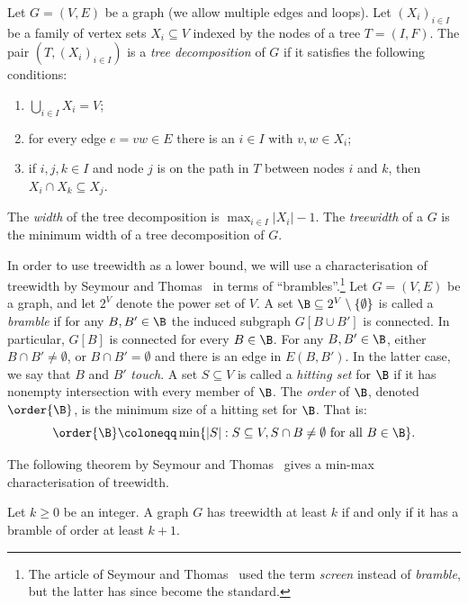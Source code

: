 Let $G=(V,E)$ be a graph (we allow multiple edges and loops). Let $(X_i)_{i\in I}$ be a family of vertex sets $X_i\subseteq V$ indexed by the nodes of a tree $T=(I,F)$. The pair $(T,(X_i)_{i\in I})$ is a \emph{tree decomposition} of $G$ if it satisfies the following conditions: 
\begin{enumerate}[label=(\roman*)]
 \item $\bigcup_{i\in I} X_i = V$;
 \item for every edge $e=vw\in E$ there is an $i\in I$ with $v,w\in X_i$;
 \item if $i,j,k\in I$ and node $j$ is on the path in $T$ between nodes $i$ and $k$, then $X_i\cap X_k\subseteq X_j$.
\end{enumerate}
The \emph{width} of the tree decomposition is $\max_{i\in I} |X_i|-1$. The \emph{treewidth} of a $G$ is the minimum width of a tree decomposition of $G$. 


In order to use treewidth as a lower bound, we will use a characterisation of treewidth by Seymour and Thomas~\cite{SeymourThomas1993} in terms of ``brambles''.\footnote{The article of Seymour and Thomas~\cite{SeymourThomas1993} used the term \emph{screen} instead of \emph{bramble}, but the latter has since become the standard.} Let $G=(V,E)$ be a graph, and let $2^V$ denote the power set of $V$. A set $\B\subseteq 2^V\setminus\{\emptyset\}$ is called a \emph{bramble} if for any $B,B'\in \B$ the induced subgraph $G[B\cup B']$ is connected. In particular, $G[B]$ is connected for every $B\in \B$. For any $B,B'\in \B$, either $B\cap B'\neq \emptyset$, or $B\cap B'=\emptyset$ and there is an edge in $E(B,B')$. In the latter case, we say that $B$ and $B'$ \emph{touch}.
A set $S\subseteq V$ is called a \emph{hitting set} for $\B$ if it has nonempty intersection with every member of $\B$. The \emph{order} of $\B$, denoted $\order{\B}$, is the minimum size of a hitting set for $\B$. That is:
\begin{equation}
\order{\B}\coloneqq \min \{|S| : S\subseteq V, S\cap B\neq\emptyset \text{ for all $B\in \B$}\}.
\end{equation}

The following theorem by Seymour and Thomas~\cite{SeymourThomas1993} gives a min-max characterisation of treewidth.

\begin{theorem}
Let $k\geq 0$ be an integer. A graph $G$ has treewidth at least $k$ if and only if it has a bramble of order at least $k + 1$.
\end{theorem} 

